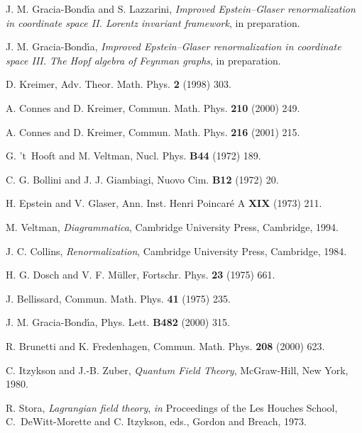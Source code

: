 \documentclass[a4paper,12pt]{article}
\newcommand{\7}{\dagger}           %
\theoremstyle{plain}
\theoremstyle{definition}
\begin{document}
\begin{thebibliography}{53}


J. M. Gracia-Bond\'{\i}a and S. Lazzarini,
\textsl{Improved Epstein--Glaser renormalization in coordinate space
II. Lorentz invariant framework}, in preparation.

J. M. Gracia-Bond\'{\i}a,
\textsl{Improved Epstein--Glaser renormalization in coordinate space
III. The Hopf algebra of Feynman graphs}, in preparation.

D. Kreimer,
Adv. Theor. Math. Phys. {\bf 2} (1998) 303.

A. Connes and D. Kreimer,
Commun. Math. Phys. {\bf 210} (2000) 249.

A. Connes and D. Kreimer,
Commun. Math. Phys. {\bf 216} (2001) 215.

G. 't~Hooft and M. Veltman,
Nucl. Phys. {\bf B44} (1972) 189.

C. G. Bollini and J. J. Giambiagi,
Nuovo Cim. {\bf B12} (1972) 20.

H. Epstein and V. Glaser,
Ann. Inst. Henri Poincar\'e A {\bf XIX} (1973) 211.

M. Veltman,
\textit{Diagrammatica},
Cambridge University Press, Cambridge, 1994.

J. C. Collins,
\textit{Renormalization},
Cambridge University Press, Cambridge, 1984.

H. G. Dosch and V. F. M\"uller,
Fortschr. Phys. {\bf 23} (1975) 661.

J. Bellissard,
Commun. Math. Phys. {\bf 41} (1975) 235.

J. M. Gracia-Bond\'{\i}a,
Phys. Lett. {\bf B482} (2000) 315.

R. Brunetti and K. Fredenhagen,
Commun. Math. Phys. {\bf 208} (2000) 623.

C. Itzykson and J.-B. Zuber,
\textit{Quantum Field Theory},
McGraw-Hill, New York, 1980.

R. Stora,
\textsl{Lagrangian field theory}, \textit{in}
Proceedings of the Les Houches School,
C.~DeWitt-Morette and C. Itzykson, eds.,
Gordon and Breach, 1973.


\end{thebibliography}
\end{document}

